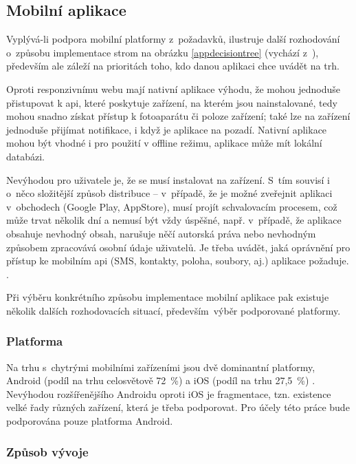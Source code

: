 \documentclass[a4paper,11pt,openany,twoside]{book}
\begin{document}
\subsection{Mobilní aplikace}

Vyplývá-li podpora mobilní platformy z~požadavků, ilustruje další rozhodování o~způsobu implementace strom na obrázku \ref{appdecisiontree} (vychází z~\cite{matyunina2020native}), především ale záleží na prioritách toho, kdo danou aplikaci chce uvádět na trh.

Oproti responzivnímu webu mají nativní aplikace výhodu, že mohou jednoduše přistupovat k \acs{api}, které poskytuje zařízení, na kterém jsou nainstalované, tedy mohou snadno získat přístup k fotoaparátu či poloze zařízení; také lze na zařízení jednoduše přijímat notifikace, i když je aplikace na pozadí. Nativní aplikace mohou být vhodné i pro použití v offline režimu, aplikace může mít lokální databázi.

Nevýhodou pro uživatele je, že se musí instalovat na zařízení. S~tím souvisí i o~něco složitější způsob distribuce -- v~případě, že je možné zveřejnit aplikaci v~obchodech (Google Play, AppStore), musí projít schvalovacím procesem, což může trvat několik dní a nemusí být vždy úspěšné, např. v~případě, že aplikace obsahuje nevhodný obsah, narušuje něčí autorská práva nebo nevhodným způsobem zpracovává osobní údaje uživatelů. Je třeba uvádět, jaká oprávnění pro přístup ke mobilním \acs{api} (SMS, kontakty, poloha, soubory, aj.) aplikace požaduje. \cite{google2021policy}.

Při výběru konkrétního způsobu implementace mobilní aplikace pak existuje několik dalších rozhodovacích situací, především~výběr podporované platformy.

\subsubsection{Platforma}
Na trhu s~chytrými mobilními zařízeními jsou dvě dominantní platformy, Android (podíl na trhu celosvětově 72~\%) a iOS (podíl na trhu 27,5~\%) \cite{statcounter2021mobile}. Nevýhodou rozšířenějšího Androidu oproti iOS je fragmentace, tzn. existence velké řady různých zařízení, která je třeba podporovat. Pro účely této práce bude podporována pouze platforma Android.


\subsubsection{Způsob vývoje}
\end{document}
